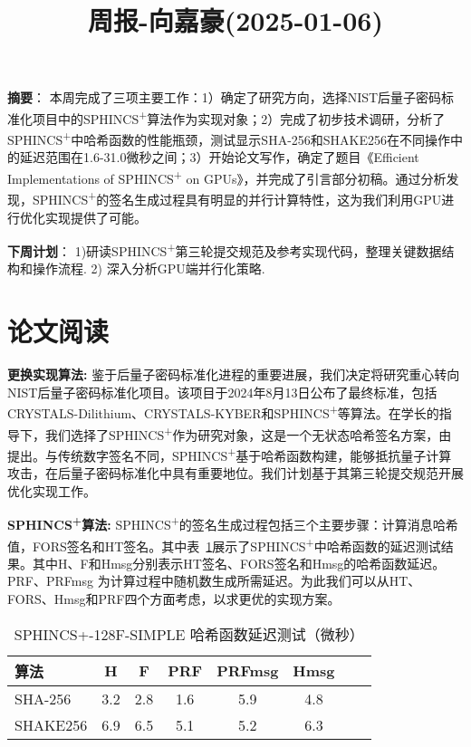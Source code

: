 \documentclass[11pt,a4paper]{article}
\title{周报-向嘉豪(2025-01-06)}
\renewcommand{\maketitle}{
  \begin{center}
    \LARGE\bfseries\thetitle
  \end{center}
}
\begin{document}
\maketitle

\noindent \textbf{摘要}：
本周完成了三项主要工作：1）确定了研究方向，选择NIST后量子密码标准化项目中的SPHINCS\textsuperscript{+}算法作为实现对象；2）完成了初步技术调研，分析了SPHINCS\textsuperscript{+}中哈希函数的性能瓶颈，测试显示SHA-256和SHAKE256在不同操作中的延迟范围在1.6-31.0微秒之间；3）开始论文写作，确定了题目《Efficient Implementations of SPHINCS\textsuperscript{+} on GPUs》，并完成了引言部分初稿。通过分析发现，SPHINCS\textsuperscript{+}的签名生成过程具有明显的并行计算特性，这为我们利用GPU进行优化实现提供了可能。

\vspace{1em}
\noindent \textbf{下周计划}： 1)研读SPHINCS\textsuperscript{+}第三轮提交规范及参考实现代码，整理关键数据结构和操作流程. 2) 深入分析GPU端并行化策略\cite{Wang2025}.

\section{论文阅读}
\noindent \textbf{更换实现算法: } 鉴于后量子密码标准化进程的重要进展，我们决定将研究重心转向NIST后量子密码标准化项目。该项目于2024年8月13日公布了最终标准，包括CRYSTALS-Dilithium、CRYSTALS-KYBER和SPHINCS\textsuperscript{+}等算法。在学长的指导下，我们选择了SPHINCS\textsuperscript{+}作为研究对象，这是一个无状态哈希签名方案，由\cite{Bernstein2019}提出。与传统数字签名不同，SPHINCS\textsuperscript{+}基于哈希函数构建，能够抵抗量子计算攻击，在后量子密码标准化中具有重要地位。我们计划基于其第三轮提交规范开展优化实现工作。

\noindent \textbf{SPHINCS\textsuperscript{+}算法: } SPHINCS\textsuperscript{+}的签名生成过程包括三个主要步骤：计算消息哈希值，FORS签名和HT签名。其中表~\ref{tab:hash_latency}展示了SPHINCS\textsuperscript{+}中哈希函数的延迟测试结果。其中H、F和Hmsg分别表示HT签名、FORS签名和Hmsg的哈希函数延迟。PRF、PRFmsg 为计算过程中随机数生成所需延迟。为此我们可以从HT、FORS、Hmsg和PRF四个方面考虑，以求更优的实现方案。

\begin{table}[htbp]
\centering
\caption{SPHINCS+-128F-SIMPLE 哈希函数延迟测试（微秒）\cite{Wang2025}}
\label{tab:hash_latency}
\begin{tabular}{lccccccc}
\toprule
算法 & H & F & PRF & PRFmsg & Hmsg \\
\midrule
SHA-256  & 3.2 & 2.8 & 1.6 & 5.9 & 4.8 \\
SHAKE256  & 6.9 & 6.5 & 5.1 & 5.2 & 6.3 \\
\bottomrule
\end{tabular}
\end{table}
\end{document}
